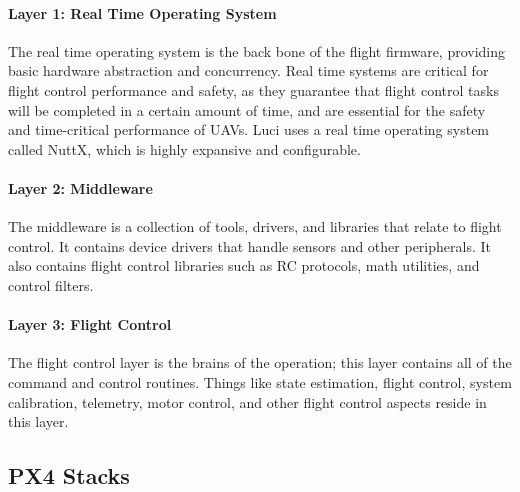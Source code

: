 \paragraph{Layer 1: Real Time Operating System\\} %
\label{par:layer_1_real_time_operating_system}
The real time operating system is the back bone of the flight firmware, providing basic hardware abstraction and concurrency. Real time systems are critical for flight control performance and safety, as they guarantee that flight control tasks will be completed in a certain amount of time, and are essential for the safety and time-critical performance of UAVs. Luci uses a real time operating system called NuttX, which is highly expansive and configurable.

\paragraph{Layer 2: Middleware\\} %
\label{par:layer_2_middleware}
The middleware is a collection of tools, drivers, and libraries that relate to flight control. It contains device drivers that handle sensors and other peripherals. It also contains flight control libraries such as RC protocols, math utilities, and control filters.

\paragraph{Layer 3: Flight Control\\} %
\label{par:layer_3_flight_control}
The flight control layer is the brains of the operation; this layer contains all of the command and control routines. Things like state estimation, flight control, system calibration, telemetry, motor control, and other flight control aspects reside in this layer.

\subsection{PX4 Stacks} %
\label{par:avaiable_flight_controller_}

